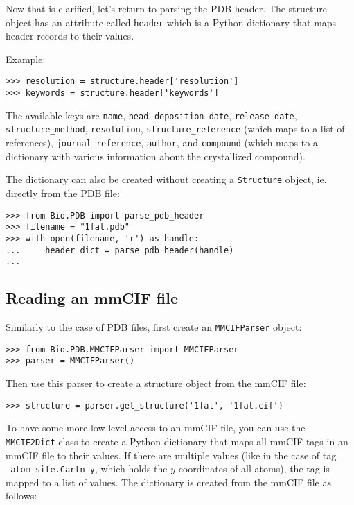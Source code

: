 Now that is clarified, let's return to parsing the PDB header. The
structure object has an attribute called \texttt{header} which is
a Python dictionary that maps header records to their values.

Example:

\begin{verbatim}
>>> resolution = structure.header['resolution']
>>> keywords = structure.header['keywords']
\end{verbatim}
The available keys are \verb+name+, \verb+head+, \verb+deposition_date+, \verb+release_date+, \verb+structure_method+, \verb+resolution+, \verb+structure_reference+ (which maps to a list of references), \verb+journal_reference+, \verb+author+, and \verb+compound+ (which maps to a dictionary with various information about the crystallized compound).

The dictionary can also be created without creating a \texttt{Structure}
object, ie. directly from the PDB file:

\begin{verbatim}
>>> from Bio.PDB import parse_pdb_header
>>> filename = "1fat.pdb"
>>> with open(filename, 'r') as handle:
...     header_dict = parse_pdb_header(handle)
...
\end{verbatim}

\subsection{Reading an mmCIF file}

Similarly to the case of PDB files, first create an \texttt{MMCIFParser} object:

\begin{verbatim}
>>> from Bio.PDB.MMCIFParser import MMCIFParser
>>> parser = MMCIFParser()
\end{verbatim}
Then use this parser to create a structure object from the mmCIF file:
\begin{verbatim}
>>> structure = parser.get_structure('1fat', '1fat.cif')
\end{verbatim}

To have some more low level access to an mmCIF file, you can use the \verb+MMCIF2Dict+ class to create a Python dictionary that maps all mmCIF
tags in an mmCIF file to their values. If there are multiple values
(like in the case of tag \verb+_atom_site.Cartn_y+, which holds
the $y$ coordinates of all atoms), the tag is mapped to a list of values.
The dictionary is created from the mmCIF file as follows:

